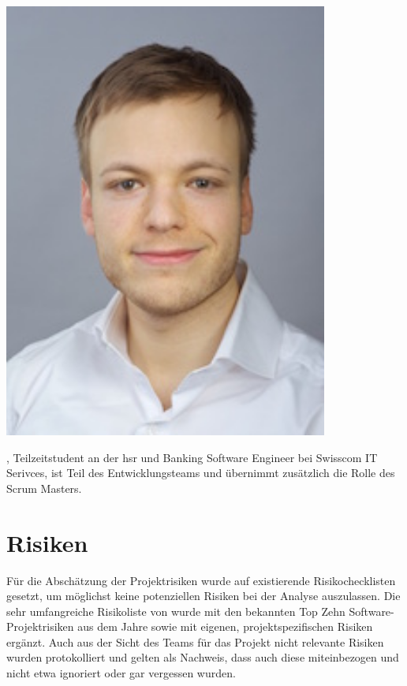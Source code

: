 \section{\fscf}
\begin{minipage}[t]{0.25\textwidth}
	\vspace{0pt}
	\includegraphics[width=0.8\textwidth]{fig/fscala}
\end{minipage}
\begin{minipage}[t]{0.8\textwidth}
	\vspace{0pt}
	\fscf, Teilzeitstudent an der \gls{hsr} und Banking Software Engineer bei Swisscom IT Serivces, ist Teil des Entwicklungsteams und übernimmt zusätzlich die Rolle des Scrum Masters.
\end{minipage}

\chapter{Risiken}\label{sec:risiken}

Für die Abschätzung der Projektrisiken wurde auf existierende \cite{risk} Risikochecklisten gesetzt, um möglichst keine potenziellen Risiken bei der Analyse auszulassen. Die sehr umfangreiche Risikoliste von \citeauthor{Wallace:2004:SPR:975817.975819} \cite{Wallace:2004:SPR:975817.975819} wurde mit den bekannten Top Zehn Software-Projektrisiken aus dem Jahre \citeyear{boehm} \cite{boehm} sowie mit eigenen, projektspezifischen Risiken ergänzt.
Auch aus der Sicht des Teams für das Projekt nicht relevante Risiken wurden protokolliert und gelten als Nachweis, dass auch diese miteinbezogen und nicht etwa ignoriert oder gar vergessen wurden.

